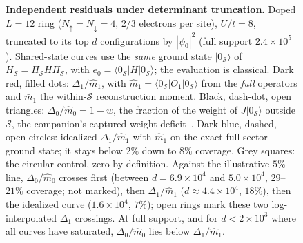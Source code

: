 \documentclass[submission, PhysCore]{SciPost}
\newcommand{\onecolfig}{\setlength{\columnwidth}{0.65\textwidth}}
\begin{document}
\begin{figure}[t]
\centering\onecolfig

\caption{\textbf{Independent residuals under determinant truncation.} Doped $L=12$ ring ($N_\uparrow=N_\downarrow=4$, $2/3$ electrons per site), $U/t=8$, truncated to its top $d$ configurations by $|\psi_0|^2$ (full support $2.4\times10^5$). Shared-state curves use the \emph{same} ground state $|0_\mathcal{S}\rangle$ of $H_\mathcal{S}=\Pi_\mathcal{S}H\Pi_\mathcal{S}$, with $e_0=\langle0_\mathcal{S}|H|0_\mathcal{S}\rangle$; the evaluation is classical. Dark red, filled dots: $\Delta_1/\widehat m_1$, with ${\widehat m_1=\langle0_\mathcal{S}|O_1|0_\mathcal{S}\rangle}$ from the \emph{full} operators and $\bar m_1$ the within-$\mathcal{S}$ reconstruction moment. Black, dash-dot, open triangles: $\Delta_0/\widehat m_0=1-w$, the fraction of the weight of $J|0_\mathcal{S}\rangle$ outside $\mathcal{S}$, the companion's captured-weight deficit~\cite{SQDspec2608}. Dark blue, dashed, open circles: idealized $\Delta_1/\widehat m_1$ with $\widehat m_1$ on the exact full-sector ground state; it stays below $2\%$ down to $8\%$ coverage. Grey squares: the circular control, zero by definition. Against the illustrative $5\%$ line, $\Delta_0/\widehat m_0$ crosses first (between $d=6.9\times10^4$ and $5.0\times10^4$, $29$--$21\%$ coverage; not marked), then $\Delta_1/\widehat m_1$ ($d\approx4.4\times10^{4}$, $18\%$), then the idealized curve ($1.6\times10^{4}$, $7\%$); open rings mark these two log-interpolated $\Delta_1$ crossings. At full support, and for $d<2\times10^3$ where all curves have saturated, $\Delta_0/\widehat m_0$ lies below $\Delta_1/\widehat m_1$.}
\label{fig:teethshared}
\label{fig:teeth}
\end{figure}
\end{document}
